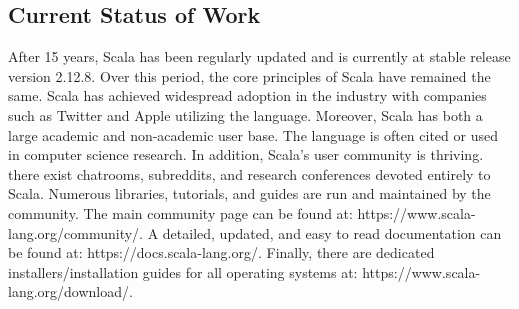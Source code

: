 \documentclass[jou,apacite]{IEEEtran}
\begin{document}
\subsection{Current Status of Work}
After 15 years, Scala has been regularly updated and is currently at stable
release version 2.12.8. Over this period, the core principles of Scala have
remained the same. Scala has achieved widespread adoption in the industry with
companies such as Twitter and Apple utilizing the language. Moreover, Scala has
both a large academic and non-academic user base. The language is often cited or
used in computer science research. In addition, Scala's user community is
thriving. there exist chatrooms, subreddits, and research conferences devoted
entirely to Scala. Numerous libraries, tutorials, and guides are run and
maintained by the community. The main community page can be found at:
https://www.scala-lang.org/community/. A detailed, updated, and easy to read
documentation can be found at: https://docs.scala-lang.org/. Finally, there are
dedicated installers/installation guides for all operating systems at:
https://www.scala-lang.org/download/.




\end{document}
